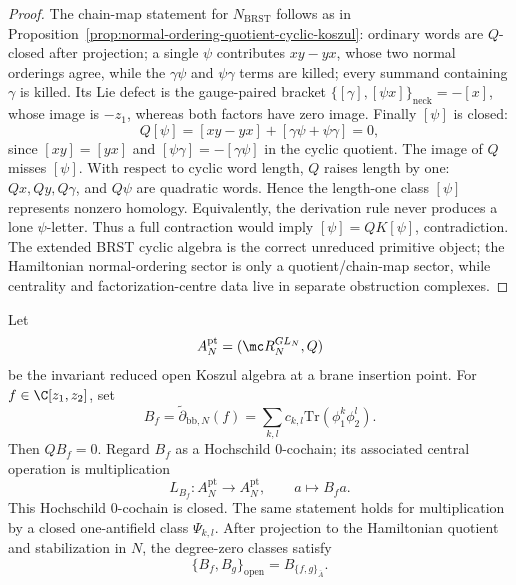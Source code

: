 \documentclass[11pt]{memoir}
\begin{document}
\begin{proof}
  The chain-map statement for \(N_{\mathrm{BRST}}\) follows as in
  Proposition~\ref{prop:normal-ordering-quotient-cyclic-koszul}: ordinary
  words are \(Q\)-closed after projection; a single \(\psi\) contributes
  \(xy-yx\), whose two normal orderings agree, while the \(\gamma\psi\) and
  \(\psi\gamma\) terms are killed; every summand containing \(\gamma\) is
  killed.  Its Lie defect is the gauge-paired bracket
  \(\{[\gamma],[\psi x]\}_{\mathrm{neck}}=-[x]\), whose image is \(-z_1\),
  whereas both factors have zero image.  Finally \([\psi]\) is closed:
  \[
    Q[\psi]=[xy-yx]+[\gamma\psi+\psi\gamma]=0,
  \]
  since \([xy]=[yx]\) and \([\psi\gamma]=-[\gamma\psi]\) in the cyclic
  quotient.  The image of \(Q\) misses \([\psi]\).  With respect to cyclic
  word length, \(Q\) raises length by one: \(Qx,Qy,Q\gamma\), and
  \(Q\psi\) are quadratic words.  Hence the length-one class \([\psi]\)
  represents nonzero homology.  Equivalently, the derivation rule never produces
  a lone \(\psi\)-letter.  Thus a full contraction would imply
  \([\psi]=QK[\psi]\), contradiction.  The extended BRST cyclic algebra is
  the correct unreduced primitive object; the Hamiltonian normal-ordering
  sector is only a quotient/chain-map sector, while centrality and
  factorization-centre data live in separate obstruction complexes.
\end{proof}

\begin{prop}\label{prop:stalk-central-multiplication}
  Let
  $$A_N^{\mathrm{pt}}=(\mc R_N^{GL_N},Q)$$
  be the invariant reduced open Koszul algebra at a brane insertion point. For
  $f\in\C[z_1,z_2]$, set
  $$B_f=\widetilde\partial_{\mathrm{bb},N}(f)
    =\sum_{k,l}c_{k,l}\mathrm{Tr}(\phi_1^k\phi_2^l).$$
  Then $QB_f=0$. Regard $B_f$ as a Hochschild $0$-cochain; its associated
  central operation is multiplication
  $$L_{B_f}:A_N^{\mathrm{pt}}\to A_N^{\mathrm{pt}},\qquad
    a\longmapsto B_fa.$$
  This Hochschild $0$-cochain is closed. The same statement holds for
  multiplication by a closed one-antifield class $\Psi_{k,l}$. After projection to the
  Hamiltonian quotient and stabilization in $N$, the degree-zero classes satisfy
  $$\{B_f,B_g\}_{\mathrm{open}}=B_{\{f,g\}_{\bar A}}.$$
\end{prop}
\end{document}
